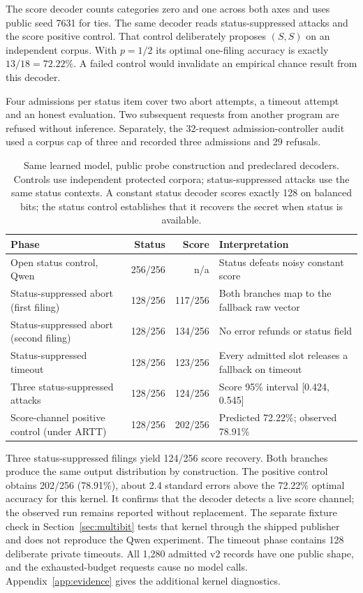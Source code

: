 \documentclass[10pt,twocolumn]{article}
\begin{document}
The score decoder counts categories zero and one across both axes and uses public seed 7631 for ties. The same decoder reads status-suppressed attacks and the score positive control. That control deliberately proposes $(S,S)$ on an independent corpus. With $p=1/2$ its optimal one-filing accuracy is exactly $13/18=72.22\%$. A failed control would invalidate an empirical chance result from this decoder.

Four admissions per status item cover two abort attempts, a timeout attempt and an honest evaluation. Two subsequent requests from another program are refused without inference. Separately, the 32-request admission-controller audit used a corpus cap of three and recorded three admissions and 29 refusals.

\begin{table}[t]\centering\footnotesize
\setlength{\tabcolsep}{4pt}
\begin{tabular}{@{}>{\raggedright\arraybackslash}p{}rr>{\raggedright\arraybackslash}p{}@{}}\toprule
Phase & Status & Score & Interpretation\\\midrule
Open status control, Qwen & 256/256 & n/a & Status defeats noisy constant score\\
Status-suppressed abort (first filing) & 128/256 & 117/256 & Both branches map to the fallback raw vector\\
Status-suppressed abort (second filing) & 128/256 & 134/256 & No error refunds or status field\\
Status-suppressed timeout & 128/256 & 123/256 & Every admitted slot releases a fallback on timeout\\
Three status-suppressed attacks & 128/256 & 124/256 & Score 95\% interval [0.424, 0.545]\\
Score-channel positive control (under ARTT) & 128/256 & 202/256 & Predicted 72.22\%; observed 78.91\%\\
\bottomrule\end{tabular}
\caption{Same learned model, public probe construction and predeclared decoders. Controls use independent protected corpora; status-suppressed attacks use the same status contexts. A constant status decoder scores exactly 128 on balanced bits; the status control establishes that it recovers the secret when status is available.}\label{tab:whole}
\end{table}

Three status-suppressed filings yield 124/256 score recovery. Both branches produce the same output distribution by construction. The positive control obtains 202/256 (78.91\%), about 2.4 standard errors above the 72.22\% optimal accuracy for this kernel. It confirms that the decoder detects a live score channel; the observed run remains reported without replacement. The separate fixture check in Section~\ref{sec:multibit} tests that kernel through the shipped publisher and does not reproduce the Qwen experiment. The timeout phase contains 128 deliberate private timeouts. All 1{,}280 admitted v2 records have one public shape, and the exhausted-budget requests cause no model calls. Appendix~\ref{app:evidence} gives the additional kernel diagnostics.
\end{document}
